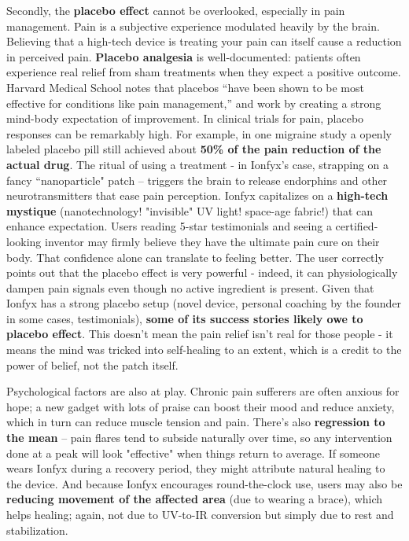\documentclass{article}
\begin{document}
Secondly, the \textbf{placebo effect} cannot be overlooked, especially in pain management. Pain is a subjective experience modulated heavily by the brain. Believing that a high-tech device is treating your pain can itself cause a reduction in perceived pain. \textbf{Placebo analgesia} is well-documented: patients often experience real relief from sham treatments when they expect a positive outcome. Harvard Medical School notes that placebos “have been shown to be most effective for conditions like pain management,” and work by creating a strong mind-body expectation of improvement. In clinical trials for pain, placebo responses can be remarkably high. For example, in one migraine study a openly labeled placebo pill still achieved about \textbf{50\% of the pain reduction of the actual drug}. The ritual of using a treatment - in Ionfyx's case, strapping on a fancy “nanoparticle" patch – triggers the brain to release endorphins and other neurotransmitters that ease pain perception. Ionfyx capitalizes on a \textbf{high-tech mystique} (nanotechnology! "invisible" UV light! space-age fabric!) that can enhance expectation. Users reading 5-star testimonials and seeing a certified-looking inventor may firmly believe they have the ultimate pain cure on their body. That confidence alone can translate to feeling better. The user correctly points out that the placebo effect is very powerful - indeed, it can physiologically dampen pain signals even though no active ingredient is present. Given that Ionfyx has a strong placebo setup (novel device, personal coaching by the founder in some cases, testimonials), \textbf{some of its success stories likely owe to placebo effect}. This doesn't mean the pain relief isn't real for those people - it means the mind was tricked into self-healing to an extent, which is a credit to the power of belief, not the patch itself.

Psychological factors are also at play. Chronic pain sufferers are often anxious for hope; a new gadget with lots of praise can boost their mood and reduce anxiety, which in turn can reduce muscle tension and pain. There's also \textbf{regression to the mean} – pain flares tend to subside naturally over time, so any intervention done at a peak will look "effective" when things return to average. If someone wears Ionfyx during a recovery period, they might attribute natural healing to the device. And because Ionfyx encourages round-the-clock use, users may also be \textbf{reducing movement of the affected area} (due to wearing a brace), which helps healing; again, not due to UV-to-IR conversion but simply due to rest and stabilization.
\end{document}
